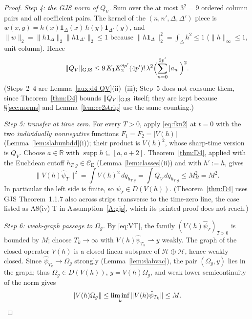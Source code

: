 \documentclass[11pt,a4paper]{article}
\theoremstyle{plain}
\theoremstyle{definition}
\theoremstyle{plain}
\theoremstyle{definition}
\newcommand{\R}{\mathbb{R}}
\newcommand{\CE}{\mathcal{C}_{\mathrm E}}
\newcommand{\HH}{\mathcal{H}}
\newcommand{\Om}{\Omega}
\DeclareMathOperator{\supp}{supp}
\begin{document}
\begin{proof}
\emph{Step 4: the GJS norm of $Q_V$.}
Sum over the at most $3^2=9$ ordered column pairs and all coefficient pairs. The kernel of
the $(n,n',\Delta,\Delta')$ piece is $w(x,y)=h(x)\mathbf 1_\Delta(x)\,h(y)\mathbf
1_{\Delta'}(y)$, and $\|w\|_2=\|h\mathbf 1_\Delta\|_2\|h\mathbf 1_{\Delta'}\|_2\le1$
because $\|h\mathbf 1_\Delta\|_2^2=\int_\Delta h^2\le1$ ($\|h\|_\infty\le1$, unit column).
Hence
\begin{equation}
 \|Q_V\|_{\rm GJS}\le
 9\,K_1K_2^{8p'}(4p')!\,\lambda^2\Bigl(\sum_{n=0}^{2p'}|a_n|\Bigr)^2 .
 \label{eq:QVnorm}
\end{equation}
(Steps~2--4 are Lemma~\ref{aux:d4-QV}(ii)--(iii); Step~5 does not consume them, since
Theorem~\ref{thm:D4} bounds $\|Q_V\|_{\rm GJS}$ itself; they are kept because \S\ref{sec:norms}
and Lemma~\ref{lem:ce2strip} use the same counting.)

\emph{Step 5: transfer at time zero.}
For every $T>0$, apply \eqref{eq:fkn2} at $t=0$ with the two \emph{individually
nonnegative} functions $F_1=F_2=|V(h)|$ (Lemma~\ref{lem:slabunbdd}(i)); their product is
$V(h)^2$, whose sharp-time version is $Q_V$.  Choose $a\in\R$ with
$\supp h\subseteq[a,a+2]$.  Theorem~\ref{thm:D4}, applied with the Euclidean cutoff
$h_{T,g}\in\CE$ (Lemma~\ref{lem:classes}(ii)) and with $h':=h$, gives
\begin{equation}
 \|V(h)\hat\psi_T\|^2
 =\int V(h)^2\,dq_{h_{T,g}}=\int Q_V\,dq_{h_{T,g}}\le M_B^2=M^2 .
 \label{eq:VT}
\end{equation}
In particular the left side is finite, so $\psi_T\in D(V(h))$.  (Theorem~\ref{thm:D4} uses
GJS Theorem~1.1.7 also across strips transverse to the time-zero line, the case listed as
A8(iv)-T in Assumption~\ref{A:gjs}, which its printed proof does not reach.)

\emph{Step 6: weak-graph passage to $\Om_g$.}
By \eqref{eq:VT}, the family $(V(h)\hat\psi_T)_{T>0}$ is bounded by $M$; choose
$T_k\to\infty$ with $V(h)\hat\psi_{T_k}\rightharpoonup y$ weakly. The graph of the closed
operator $V(h)$ is a closed linear subspace of $\HH\oplus\HH$, hence weakly closed. Since
$\hat\psi_{T_k}\to\Om_g$ strongly (Lemma~\ref{lem:slabvac}), the pair $(\Om_g,y)$ lies in
the graph; thus $\Om_g\in D(V(h))$, $y=V(h)\Om_g$, and weak lower semicontinuity of the
norm gives
\[
 \|V(h)\Om_g\|\le\liminf_k\|V(h)\hat\psi_{T_k}\|\le M .\qedhere
\]
\end{proof}
\end{document}
